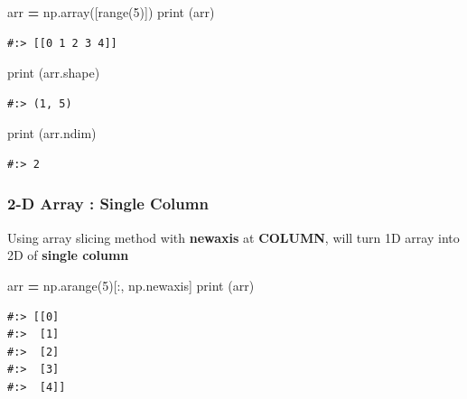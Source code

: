 \documentclass[
]{book}
\newenvironment{Shaded}{\begin{snugshade}}{\end{snugshade}}
\newcommand{\BuiltInTok}[1]{#1}
\newcommand{\DecValTok}[1]{\textcolor[rgb]{0.06,0.06,0.06}{#1}}
\newcommand{\NormalTok}[1]{#1}
\newcommand{\OperatorTok}[1]{\textcolor[rgb]{0.43,0.43,0.43}{\textbf{#1}}}
\begin{document}
\begin{Shaded}
\begin{Highlighting}[]
\NormalTok{arr }\OperatorTok{=}\NormalTok{ np.array([}\BuiltInTok{range}\NormalTok{(}\DecValTok{5}\NormalTok{)])}
\BuiltInTok{print}\NormalTok{ (arr)}
\end{Highlighting}
\end{Shaded}

\begin{verbatim}
#:> [[0 1 2 3 4]]
\end{verbatim}

\begin{Shaded}
\begin{Highlighting}[]
\BuiltInTok{print}\NormalTok{ (arr.shape)}
\end{Highlighting}
\end{Shaded}

\begin{verbatim}
#:> (1, 5)
\end{verbatim}

\begin{Shaded}
\begin{Highlighting}[]
\BuiltInTok{print}\NormalTok{ (arr.ndim)}
\end{Highlighting}
\end{Shaded}

\begin{verbatim}
#:> 2
\end{verbatim}

\hypertarget{d-array-single-column}{%
\subsubsection{2-D Array : Single Column}\label{d-array-single-column}}

Using array slicing method with \textbf{newaxis} at \textbf{COLUMN}, will turn 1D array into 2D of \textbf{single column}

\begin{Shaded}
\begin{Highlighting}[]
\NormalTok{arr }\OperatorTok{=}\NormalTok{ np.arange(}\DecValTok{5}\NormalTok{)[:, np.newaxis]}
\BuiltInTok{print}\NormalTok{ (arr)}
\end{Highlighting}
\end{Shaded}

\begin{verbatim}
#:> [[0]
#:>  [1]
#:>  [2]
#:>  [3]
#:>  [4]]
\end{verbatim}
\end{document}
